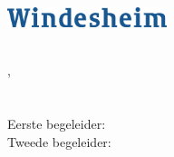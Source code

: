 \documentclass[10pt,a4paper,oneside]{report}
\title{\titel}
\author{\auteur}
\date{\datum}
\begin{document}
\begin{titlepage}
    \vspace*{-0.9cm}
    \hfill
    \includegraphics[width=0.35\textwidth]{windesheim} \\
    
    \begin{center}
    \vspace*{3cm}
    {\huge\thetitle}
    
    \vspace*{0.4cm}
    \textnormal{\ondertitel}
    \end{center}
    
    \vfill
    \raggedleft
    \theauthor \\
    \thedate, \plaats \\
    
    \vspace{\vertspace}
    \school \\
    \domein \\

    \vspace{\vertspace}
    Eerste begeleider: \begeleidereen \\
    Tweede begeleider: \begeleidertwee \\
    \organisatie \\

\end{titlepage}
\end{document}
